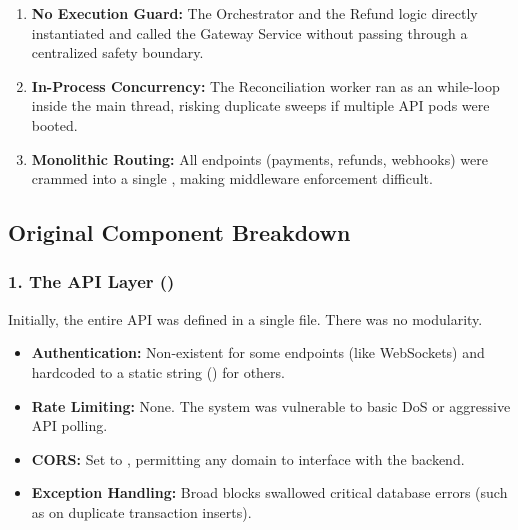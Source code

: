 \begin{tcolorbox}[dangerbox={Critical Architectural Flaws Displayed Above}]
\begin{enumerate}
    \item \textbf{No Execution Guard:} The Orchestrator and the Refund logic directly instantiated and called the Gateway Service without passing through a centralized safety boundary.
    \item \textbf{In-Process Concurrency:} The Reconciliation worker ran as an  while-loop inside the main thread, risking duplicate sweeps if multiple API pods were booted.
    \item \textbf{Monolithic Routing:} All endpoints (payments, refunds, webhooks) were crammed into a single , making middleware enforcement difficult.
\end{enumerate}
\end{tcolorbox}

\vspace{0.8cm}

\subsection{Original Component Breakdown}

\subsubsection{1. The API Layer ()}
Initially, the entire API was defined in a single file. There was no modularity.
\begin{itemize}
    \item \textbf{Authentication:} Non-existent for some endpoints (like WebSockets) and hardcoded to a static string () for others.
    \item \textbf{Rate Limiting:} None. The system was vulnerable to basic DoS or aggressive API polling.
    \item \textbf{CORS:} Set to , permitting any domain to interface with the backend.
    \item \textbf{Exception Handling:} Broad  blocks swallowed critical database errors (such as  on duplicate transaction inserts).
\end{itemize}

\vspace{0.4cm}

